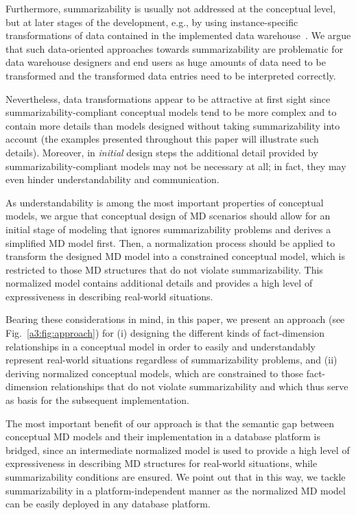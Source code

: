Furthermore, summarizability is usually not addressed at the
conceptual level, but at later stages of the development, e.g., by
using instance-specific transformations of data contained in the
implemented data warehouse~\cite{DBLP:journals/is/PedersenJD01}. We
argue that such data-oriented approaches towards summarizability are
problematic for data warehouse designers and end users as huge
amounts of data need to be transformed and the transformed data
entries need to be interpreted correctly.

Nevertheless, data transformations appear to be attractive at first
sight since summarizability-compliant conceptual models tend to be
more complex and to contain more details than models designed
without taking summarizability into account (the examples presented
throughout this paper will illustrate such details). Moreover, in
\emph{initial} design steps the additional detail provided by
summari\-zability-compliant models may not be necessary at all; in
fact, they may even hinder understandability and communication.

As understandability is among the most important properties of
conceptual models, we argue that conceptual design of MD scenarios
should allow for an initial stage of modeling that ignores
summarizability problems and derives a simplified MD model first.
Then, a normalization process should be applied to transform the
designed MD model into a constrained conceptual model, which is
restricted to those MD structures that do not violate
summarizability. This normalized model contains additional details
and provides a high level of expressiveness in describing real-world
situations.

Bearing these considerations in mind, in this paper, we present an
approach (see Fig.~\ref{a3:fig:approach}) for (i) designing the
different kinds of fact-dimension relationships in a conceptual
model in order to easily and understandably represent real-world
situations regardless of summarizability problems, and (ii) deriving
normalized conceptual models, which are constrained to those
fact-dimension relationships that do not violate summarizability and
which thus serve as basis for the subsequent implementation.

The most important benefit of our approach is that the semantic gap
between conceptual MD models and their implementation in a database
platform is bridged, since an intermediate normalized model is used
to provide a high level of expressiveness in describing MD
structures for real-world situations, while summarizability
conditions are ensured. We point out that in this way, we tackle
summarizability in a platform-independent manner as the normalized
MD model can be easily deployed in any database platform.


